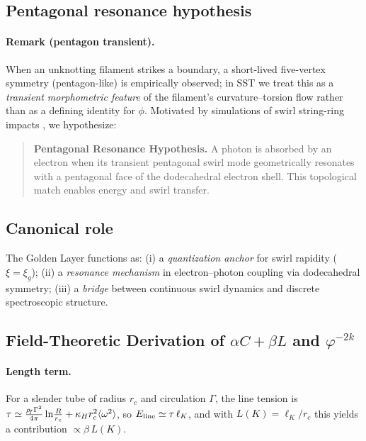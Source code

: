 \subsection{Pentagonal resonance hypothesis}
\paragraph*{Remark (pentagon transient).}
When an unknotting filament strikes a boundary, a short-lived five-vertex symmetry (pentagon-like)
is empirically observed; in SST we treat this as a \emph{transient morphometric feature} of the
filament’s curvature–torsion flow rather than as a defining identity for \(\phi\).
Motivated by simulations of swirl string-ring impacts \cite{orlandi1993vortex}, we hypothesize:

\begin{quote}
    \textbf{Pentagonal Resonance Hypothesis.}
    A photon is absorbed by an electron when its transient pentagonal swirl mode geometrically resonates with a pentagonal face of the dodecahedral electron shell. This topological match enables energy and swirl transfer.
\end{quote}

\subsection{Canonical role}
The Golden Layer functions as:
(i) a \emph{quantization anchor} for swirl rapidity (\(\xi=\xi_g\));
(ii) a \emph{resonance mechanism} in electron–photon coupling via dodecahedral symmetry;
(iii) a \emph{bridge} between continuous swirl dynamics and discrete spectroscopic structure.

\subsection{Field-Theoretic Derivation of \texorpdfstring{$\alpha C+\beta L$}{alpha C + beta L} and \texorpdfstring{$\varphi^{-2k}$}{phi^{-2k}}}
\paragraph*{Length term.}
For a slender tube of radius \(r_c\) and circulation \(\Gamma\), the line tension is
\(\tau\simeq \frac{\rho_{\!f}\Gamma^2}{4\pi}\ln\!\frac{R}{r_c}+\kappa_H r_c^2\langle\omega^2\rangle\), so \(E_{\rm line}\simeq \tau\,\ell_K\),
and with \(L(K)=\ell_K/r_c\) this yields a contribution \(\propto \beta\,L(K)\).

